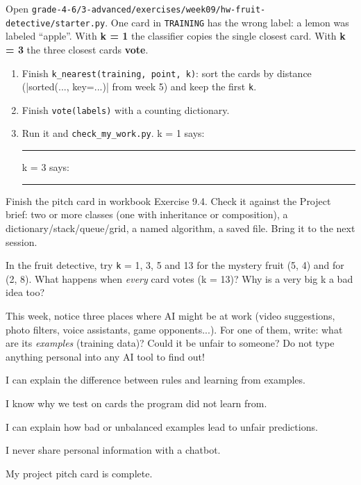 \namedateline

\begin{core}
Open \texttt{grade-4-6/3-advanced/exercises/week09/hw-fruit-detective/starter.py}. One card in \texttt{TRAINING} has the wrong label: a lemon was labeled \enquote{apple}. With \textbf{k = 1} the classifier copies the single closest card. With \textbf{k = 3} the three closest cards \textbf{vote}.
\begin{enumerate}[itemsep=1pt]
  \item Finish \texttt{k\_nearest(training, point, k)}: sort the cards by distance (\py|sorted(..., key=...)| from week 5) and keep the first \texttt{k}.
  \item Finish \texttt{vote(labels)} with a counting dictionary.
  \item Run it and \texttt{check\_my\_work.py}. \quad k = 1 says: \rule{2cm}{0.4pt} \quad k = 3 says: \rule{2cm}{0.4pt}
\end{enumerate}
\end{core}

\begin{core}
Finish the pitch card in workbook Exercise 9.4. Check it against the Project brief: two or more classes (one with inheritance or composition), a dictionary/stack/queue/grid, a named algorithm, a saved file. Bring it to the next session.
\end{core}

\begin{challenge}
In the fruit detective, try \texttt{k} = 1, 3, 5 and 13 for the mystery fruit (5, 4) and for (2, 8). What happens when \emph{every} card votes (k = 13)? Why is a very big k a bad idea too?
\end{challenge}

\begin{creative}
This week, notice three places where AI might be at work (video suggestions, photo filters, voice assistants, game opponents...). For one of them, write: what are its \emph{examples} (training data)? Could it be unfair to someone? Do not type anything personal into any AI tool to find out!
\end{creative}

\begin{selfcheck}
  \item I can explain the difference between rules and learning from examples.
  \item I know why we test on cards the program did not learn from.
  \item I can explain how bad or unbalanced examples lead to unfair predictions.
  \item I never share personal information with a chatbot.
  \item My project pitch card is complete.
\end{selfcheck}
